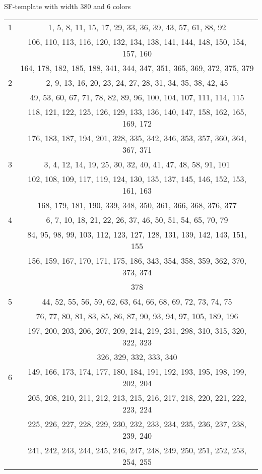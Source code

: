 \begin{center}
SF-template with width 380 and 6 colors \\

\begin{tabular}{|*{2}{c|}}
	\hline
	1 & 1, 5, 8, 11, 15, 17, 29, 33, 36, 39, 43, 57, 61, 88, 92 \\
	& 106, 110, 113, 116, 120, 132, 134, 138, 141, 144, 148, 150, 154, 157, 160 \\
	& 164, 178, 182, 185, 188, 341, 344, 347, 351, 365, 369, 372, 375, 379\\
	\hline
	2 & 2, 9, 13, 16, 20, 23, 24, 27, 28, 31, 34, 35, 38, 42, 45\\
	& 49, 53, 60, 67, 71, 78, 82, 89, 96, 100, 104, 107, 111, 114, 115\\
	& 118, 121, 122, 125, 126, 129, 133, 136, 140, 147, 158, 162, 165, 169, 172\\
	& 176, 183, 187, 194, 201, 328, 335, 342, 346, 353, 357, 360, 364, 367, 371\\
	\hline
	3 & 3, 4, 12, 14, 19, 25, 30, 32, 40, 41, 47, 48, 58, 91, 101\\
	& 102, 108, 109, 117, 119, 124, 130, 135, 137, 145, 146, 152, 153, 161, 163\\
	& 168, 179, 181, 190, 339, 348, 350, 361, 366, 368, 376, 377\\
	\hline
	4 & 6, 7, 10, 18, 21, 22, 26, 37, 46, 50, 51, 54, 65, 70, 79\\
	& 84, 95, 98, 99, 103, 112, 123, 127, 128, 131, 139, 142, 143, 151, 155\\
	& 156, 159, 167, 170, 171, 175, 186, 343, 354, 358, 359, 362, 370, 373, 374\\
	& 378\\
	\hline
	5 & 44, 52, 55, 56, 59, 62, 63, 64, 66, 68, 69, 72, 73, 74, 75\\
	& 76, 77, 80, 81, 83, 85, 86, 87, 90, 93, 94, 97, 105, 189, 196\\
	& 197, 200, 203, 206, 207, 209, 214, 219, 231, 298, 310, 315, 320, 322, 323\\
	& 326, 329, 332, 333, 340\\
	\hline
	6 & 149, 166, 173, 174, 177, 180, 184, 191, 192, 193, 195, 198, 199, 202, 204\\
	& 205, 208, 210, 211, 212, 213, 215, 216, 217, 218, 220, 221, 222, 223, 224\\
	& 225, 226, 227, 228, 229, 230, 232, 233, 234, 235, 236, 237, 238, 239, 240\\
	& 241, 242, 243, 244, 245, 246, 247, 248, 249, 250, 251, 252, 253, 254, 255\\

\end{tabular}
\end{center}
